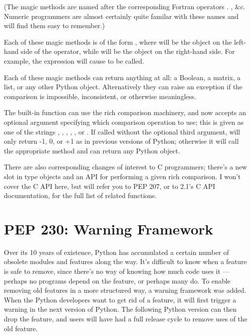 \documentclass{howto}
\begin{document}
(The magic methods are named after the corresponding Fortran operators
. , \&c.  Numeric programmers are almost
certainly quite familar with these names and will find them easy to
remember.)
 
Each of these magic methods is of the form , where  will be the object on the left-hand side of
the operator, while  will be the object on the right-hand
side.  For example, the expression  will cause
 to be called.

Each of these magic methods can return anything at all: a Boolean, a
matrix, a list, or any other Python object.  Alternatively they can
raise an exception if the comparison is impossible, inconsistent, or
otherwise meaningless.

The built-in  function can use the rich comparison
machinery, and now accepts an optional argument specifying which
comparison operation to use; this is given as one of the strings
, , , , , or
.  If called without the optional third argument,
 will only return -1, 0, or +1 as in previous versions
of Python; otherwise it will call the appropriate method and can
return any Python object.

There are also corresponding changes of interest to C programmers;
there's a new slot  in type objects and an API for
performing a given rich comparison.  I won't cover the C API here, but
will refer you to PEP 207, or to 2.1's C API documentation, for the
full list of related functions.

\begin{seealso}


\end{seealso}

\section{PEP 230: Warning Framework}

Over its 10 years of existence, Python has accumulated a certain
number of obsolete modules and features along the way.  It's difficult
to know when a feature is safe to remove, since there's no way of
knowing how much code uses it --- perhaps no programs depend on the
feature, or perhaps many do.  To enable removing old features in a
more structured way, a warning framework was added.  When the Python
developers want to get rid of a feature, it will first trigger a
warning in the next version of Python.  The following Python version
can then drop the feature, and users will have had a full release
cycle to remove uses of the old feature.
\end{document}
